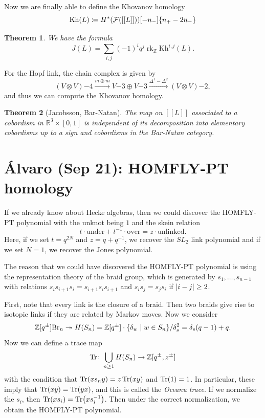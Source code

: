\documentclass[leqno, openany]{memoir}
\newtheorem{thm}{Theorem}[section]
\theoremstyle{definition}
\theoremstyle{remark}
\theoremstyle{plain}
\theoremstyle{definition}
\theoremstyle{remark}
\newcommand{\R}{\mathbb{R}}
\newcommand{\Z}{\mathbb{Z}}
\newcommand{\mc}[1]{\mathcal{#1}}
\newcommand{\mr}[1]{\mathrm{#1}}
\DeclareMathOperator{\rk}{rk}
\begin{document}
Now we are finally able to define the Khovanov homology
\[ \mr{Kh}(L) \coloneqq H^*(\mc{F}([[L]]))[-n_-]\qty{n_+ - 2n_-} \]

\begin{thm}
    We have the formula
    \[ J(L) = \sum_{i,j} {(-1)}^i q^j \rk_{\Z} \mr{ Kh }^{i,j}(L). \]
\end{thm}

For the Hopf link, the chain complex is given by
\[ (V \otimes V)\qty{-4} \xrightarrow{m \oplus m} V \qty{-3} \oplus V\qty{-3} \xrightarrow{\Delta^1 - \Delta^2} (V \otimes V) \qty{-2}, \]
and thus we can compute the Khovanov homology.

\begin{thm}[Jacobsson, Bar-Natan]
    The map on $[[L]]$ associated to a cobordism in $\R^3 \times [0,1]$ is independent of its decomposition into elementary cobordisms up to a sign and cobordisms in the Bar-Natan category.
\end{thm}

\chapter{\'Alvaro (Sep 21): HOMFLY-PT homology}%
\label{cha:'alvaro_sep_21_homfly_pt_homology}

If we already know about Hecke algebras, then we could discover the HOMFLY-PT polynomial with the unknot being $1$ and the skein relation
\[ t \cdot \text{under} + t^{-1} \cdot \text{over} = z \cdot \text{unlinked}. \]
Here, if we set $t = q^{2N}$ and $z = q + q^{-1}$, we recover the $SL_2$ link polynomial and if we set $N = 1$, we recover the Jones polynomial.

The reason that we could have discovered the HOMFLY-PT polynomial is using the representation theory of the braid group, which is generated by $s_1, \ldots, s_{n-1}$ with relations $s_i s_{i+1} s_i = s_{i+1} s_i s_{i+1}$ and $s_i s_j = s_j s_i$ if $\abs{i-j} \geq 2$.

First, note that every link is the closure of a braid. Then two braids give rise to isotopic links if they are related by Markov moves. Now we consider
\[ \Z[q^{\pm}] \mr{Br}_n \twoheadrightarrow H(S_n) = \Z[q^{\pm}] \cdot \qty{\delta_w \mid w \in S_n} / \delta_s^2 = \delta_s (q-1) + q. \]
Now we can define a trace map
\[ \Tr \colon \bigcup_{n \geq 1} H(S_n) \to \Z[q^{\pm}, z^{\pm}] \]
with the condition that $\Tr(x s_n y) = z \Tr(xy)$ and $\Tr(1) = 1$. In particular, these imply that $\Tr(xy) = \Tr(yx)$, and this is called the \textit{Oceanu trace}. If we normalize the $s_i$, then $\Tr(x s_i) = \Tr(x s_i^{-1})$. Then under the correct normalization, we obtain the HOMFLY-PT polynomial.
\end{document}
